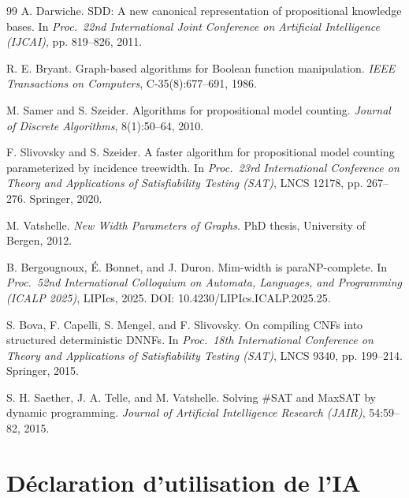 \documentclass[11pt,a4paper]{report}
\theoremstyle{plain}
\theoremstyle{definition}
\begin{document}
\begin{thebibliography}{99}
  A. Darwiche.
  \newblock SDD: A new canonical representation of propositional knowledge bases.
  \newblock In \emph{Proc.\ 22nd International Joint Conference on Artificial Intelligence (IJCAI)}, pp. 819--826, 2011.

  R. E. Bryant.
  \newblock Graph-based algorithms for Boolean function manipulation.
  \newblock \emph{IEEE Transactions on Computers}, C-35(8):677--691, 1986.

  M. Samer and S. Szeider.
  \newblock Algorithms for propositional model counting.
  \newblock \emph{Journal of Discrete Algorithms}, 8(1):50--64, 2010.

  F. Slivovsky and S. Szeider.
  \newblock A faster algorithm for propositional model counting parameterized by incidence treewidth.
  \newblock In \emph{Proc.\ 23rd International Conference on Theory and Applications of Satisfiability Testing (SAT)}, LNCS 12178, pp. 267--276. Springer, 2020.

  M. Vatshelle.
  \newblock \emph{New Width Parameters of Graphs}.
  \newblock PhD thesis, University of Bergen, 2012.

  B. Bergougnoux, É. Bonnet, and J. Duron.
  \newblock Mim-width is paraNP-complete.
  \newblock In \emph{Proc.\ 52nd International Colloquium on Automata, Languages, and Programming (ICALP 2025)}, LIPIcs, 2025.
  \newblock DOI: 10.4230/LIPIcs.ICALP.2025.25.

  S. Bova, F. Capelli, S. Mengel, and F. Slivovsky.
  \newblock On compiling CNFs into structured deterministic DNNFs.
  \newblock In \emph{Proc.\ 18th International Conference on Theory and Applications of Satisfiability Testing (SAT)}, LNCS 9340, pp. 199--214. Springer, 2015.

  S. H. Saether, J. A. Telle, and M. Vatshelle.
  \newblock Solving \#SAT and MaxSAT by dynamic programming.
  \newblock \emph{Journal of Artificial Intelligence Research (JAIR)}, 54:59--82, 2015.

\end{thebibliography}

\chapter*{Déclaration d'utilisation de l'IA}
\end{document}
